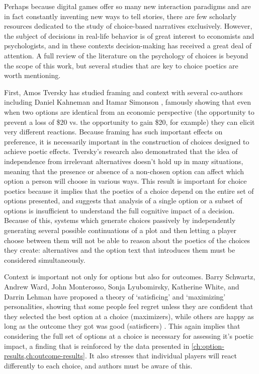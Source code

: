 Perhaps because digital games offer so many new interaction paradigms and are in fact constantly inventing new ways to tell stories, there are few scholarly resources dedicated to the study of choice-based narratives exclusively.
%
However, the subject of decisions in real-life behavior is of great interest to economists and psychologists, and in these contexts decision-making has received a great deal of attention.
%
A full review of the literature on the psychology of choices is beyond the scope of this work, but several studies that are key to choice poetics are worth mentioning.


First, Amos Tversky has studied framing and context with several co-authors including Daniel Kahneman \citep{Tversky1981} and Itamar Simonson \citep{Tversky1993}, famously showing that even when two options are identical from an economic perspective (the opportunity to prevent a loss of \$20 vs\@. the opportunity to gain \$20, for example) they can elicit very different reactions.
%
Because framing has such important effects on preference, it is necessarily important in the construction of choices designed to achieve poetic effects.
%
Tversky's research also demonstrated that the idea of independence from irrelevant alternatives doesn't hold up in many situations, meaning that the presence or absence of a non-chosen option can affect which option a person will choose in various ways.
%
This result is important for choice poetics because it implies that the poetics of a choice depend on the entire set of options presented, and suggests that analysis of a single option or a subset of options is insufficient to understand the full cognitive impact of a decision.
%
Because of this, systems which generate choices passively by independently generating several possible continuations of a plot and then letting a player choose between them will not be able to reason about the poetics of the choices they create: alternatives and the option text that introduces them must be considered simultaneously.


Context is important not only for options but also for outcomes.
%
Barry Schwartz, Andrew Ward, John Monterosso, Sonja Lyubomirsky, Katherine White, and Darrin Lehman have proposed a theory of `satisficing' and `maximizing' personalities, showing that some people feel regret unless they are confident that they selected the best option at a choice (maximizers), while others are happy as long as the outcome they got was good (satisficers) \citep{Schwartz2002}.
%
This again implies that considering the full set of options at a choice is necessary for assessing it's poetic impact, a finding that is reinforced by the data presented in \cref{ch:option-results,ch:outcome-results}.
%
It also stresses that individual players will react differently to each choice, and authors must be aware of this.


